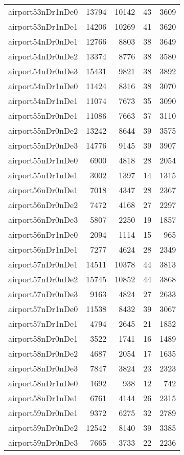 \begin{tabular}{lrrrr}
airport53nDr1nDe0 & 13794 & 10142 & 43 & 3609 \\
airport53nDr1nDe1 & 14206 & 10269 & 41 & 3620 \\
airport54nDr0nDe1 & 12766 & 8803 & 38 & 3649 \\
airport54nDr0nDe2 & 13374 & 8776 & 38 & 3580 \\
airport54nDr0nDe3 & 15431 & 9821 & 38 & 3892 \\
airport54nDr1nDe0 & 11424 & 8316 & 38 & 3070 \\
airport54nDr1nDe1 & 11074 & 7673 & 35 & 3090 \\
airport55nDr0nDe1 & 11086 & 7663 & 37 & 3110 \\
airport55nDr0nDe2 & 13242 & 8644 & 39 & 3575 \\
airport55nDr0nDe3 & 14776 & 9145 & 39 & 3907 \\
airport55nDr1nDe0 & 6900 & 4818 & 28 & 2054 \\
airport55nDr1nDe1 & 3002 & 1397 & 14 & 1315 \\
airport56nDr0nDe1 & 7018 & 4347 & 28 & 2367 \\
airport56nDr0nDe2 & 7472 & 4168 & 27 & 2297 \\
airport56nDr0nDe3 & 5807 & 2250 & 19 & 1857 \\
airport56nDr1nDe0 & 2094 & 1114 & 15 & 965 \\
airport56nDr1nDe1 & 7277 & 4624 & 28 & 2349 \\
airport57nDr0nDe1 & 14511 & 10378 & 44 & 3813 \\
airport57nDr0nDe2 & 15745 & 10852 & 44 & 3868 \\
airport57nDr0nDe3 & 9163 & 4824 & 27 & 2633 \\
airport57nDr1nDe0 & 11538 & 8432 & 39 & 3067 \\
airport57nDr1nDe1 & 4794 & 2645 & 21 & 1852 \\
airport58nDr0nDe1 & 3522 & 1741 & 16 & 1489 \\
airport58nDr0nDe2 & 4687 & 2054 & 17 & 1635 \\
airport58nDr0nDe3 & 7847 & 3824 & 23 & 2323 \\
airport58nDr1nDe0 & 1692 & 938 & 12 & 742 \\
airport58nDr1nDe1 & 6761 & 4144 & 26 & 2315 \\
airport59nDr0nDe1 & 9372 & 6275 & 32 & 2789 \\
airport59nDr0nDe2 & 12542 & 8140 & 39 & 3385 \\
airport59nDr0nDe3 & 7665 & 3733 & 22 & 2236 \\

\end{tabular}
